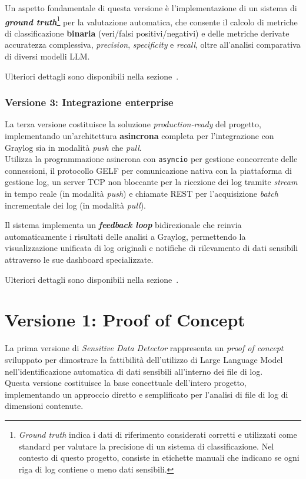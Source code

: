 \documentclass[12pt,twoside]{report}
\begin{document}
Un aspetto fondamentale di questa versione è l'implementazione di un sistema di \textbf{\textit{ground truth}}\footnote{\textit{Ground truth} indica i dati di riferimento considerati corretti e utilizzati come standard per valutare la precisione di un sistema di classificazione. Nel contesto di questo progetto, consiste in etichette manuali che indicano se ogni riga di log contiene o meno dati sensibili.} per la valutazione automatica, che consente il calcolo di metriche di classificazione \textbf{binaria} (veri/falsi positivi/negativi) e delle metriche derivate accuratezza complessiva, \textit{precision}, \textit{specificity} e \textit{recall}, oltre all'analisi comparativa di diversi modelli LLM.

Ulteriori dettagli sono disponibili nella sezione~.

\subsubsection{Versione 3: Integrazione enterprise}

La terza versione costituisce la soluzione \textit{production-ready} del progetto, implementando un'architettura \textbf{asincrona} completa per l'integrazione con Graylog sia in modalità \textit{push} che \textit{pull}.\\
Utilizza la programmazione asincrona con \texttt{asyncio} per gestione concorrente delle connessioni, il protocollo GELF per comunicazione nativa con la piattaforma di gestione log, un server TCP non bloccante per la ricezione dei log tramite \textit{stream} in tempo reale (in modalità \textit{push}) e chiamate REST per l'acquisizione \textit{batch} incrementale dei log (in modalità \textit{pull}).

Il sistema implementa un \textbf{\textit{feedback loop}} bidirezionale che reinvia automaticamente i risultati delle analisi a Graylog, permettendo la visualizzazione unificata di log originali e notifiche di rilevamento di dati sensibili attraverso le sue dashboard specializzate.

Ulteriori dettagli sono disponibili nella sezione~.


\section{Versione 1: Proof of Concept}
\label{sec:ver1}

La prima versione di \textit{Sensitive Data Detector} rappresenta un \textit{proof of concept} sviluppato per dimostrare la fattibilità dell'utilizzo di Large Language Model nell'identificazione automatica di dati sensibili all'interno dei file di log.\\
Questa versione costituisce la base concettuale dell'intero progetto, implementando un approccio diretto e semplificato per l'analisi di file di log di dimensioni contenute.
\end{document}
